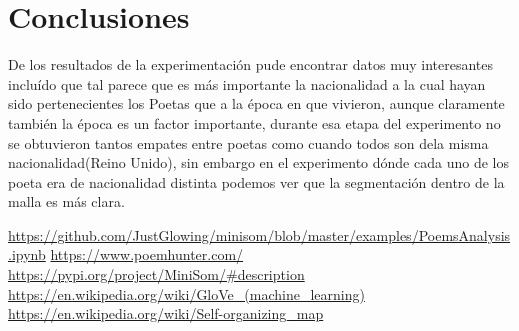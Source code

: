 \documentclass[a4paper, 11pt, oneside]{article}
\begin{document}
\section*{Conclusiones}
De los resultados de la experimentación pude encontrar datos muy interesantes incluído que tal parece que es más importante la nacionalidad a la cual hayan sido pertenecientes los Poetas que a la época en que vivieron, aunque claramente también la época es un factor importante, durante esa etapa del experimento no se obtuvieron tantos empates entre poetas como cuando todos son dela misma nacionalidad(Reino Unido), sin embargo en el experimento dónde cada uno de los poeta era de nacionalidad distinta podemos ver que la segmentación dentro de la malla es más clara.

\begin{thebibliography}{}
\url{https://github.com/JustGlowing/minisom/blob/master/examples/PoemsAnalysis.ipynb}
\url{https://www.poemhunter.com/}
\url{https://pypi.org/project/MiniSom/#description}
\url{https://en.wikipedia.org/wiki/GloVe_(machine_learning)}
\url{https://en.wikipedia.org/wiki/Self-organizing_map}
\end{thebibliography}
\end{document}
